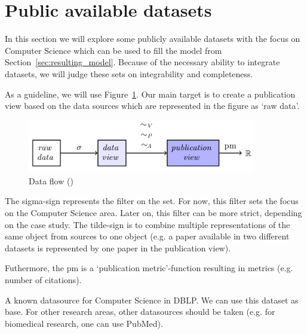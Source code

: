 \documentclass{ou-report}
\begin{document}

\section{Public available datasets}
\label{sec:data_public_datasets}
In this section we will explore some publicly available datasets with the focus 
on Computer Science which can be used to fill the model from 
Section~\ref{sec:resulting_model}. Because of the necessary ability to integrate 
datasets, we will judge these sets on integrability and completeness.

As a guideline, we will use Figure~\ref{fig:dataflow_jm2017_a}. Our main target
is to create a publication view based on the data sources which are represented
in the figure as `raw data'.
\begin{figure}[H]
    \centering
    \includegraphics[width=10cm]{images/data_to_publication_metrics_jm2017.png}
    \caption{Data flow (\cite{JM2017})}
    \label{fig:dataflow_jm2017_a}
\end{figure}

The sigma-sign represents the filter on the set. For now, this filter sets the 
focus on the Computer Science area. Later on, this filter can be more 
strict, depending on the case study.
The tilde-sign is to combine multiple representations of the same object from 
sources to one object (e.g. a paper available in two different datasets is 
represented by one paper in the publication view).

Futhermore, the pm is a `publication metric'-function resulting in metrics 
(e.g. number of citations).

A known datasource for Computer Science in DBLP. We can use this dataset as base.
For other research areas, other datasources should be taken (e.g. for 
biomedical research, one can use PubMed).
\end{document}
